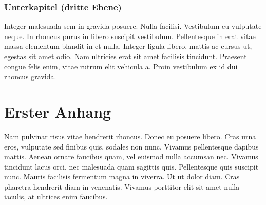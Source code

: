 \documentclass[12pt,a4paper,parskip=half]{scrartcl}
\begin{document}
\subsubsection{Unterkapitel (dritte Ebene)}

Integer malesuada sem in gravida posuere. Nulla facilisi. Vestibulum eu vulputate neque. In rhoncus purus in libero suscipit vestibulum. Pellentesque in erat vitae massa elementum blandit in et nulla. Integer ligula libero, mattis ac cursus ut, egestas sit amet odio. Nam ultricies erat sit amet facilisis tincidunt. Praesent congue felis enim, vitae rutrum elit vehicula a. Proin vestibulum ex id dui rhoncus gravida.

\OWbibliography

\OWappendix

\section{Erster Anhang}

Nam pulvinar risus vitae hendrerit rhoncus. Donec eu posuere libero. Cras urna eros, vulputate sed finibus quis, sodales non nunc. Vivamus pellentesque dapibus mattis. Aenean ornare faucibus quam, vel euismod nulla accumsan nec. Vivamus tincidunt lacus orci, nec malesuada quam sagittis quis. Pellentesque quis suscipit nunc. Mauris facilisis fermentum magna in viverra. Ut ut dolor diam. Cras pharetra hendrerit diam in venenatis. Vivamus porttitor elit sit amet nulla iaculis, at ultrices enim faucibus.
\end{document}
